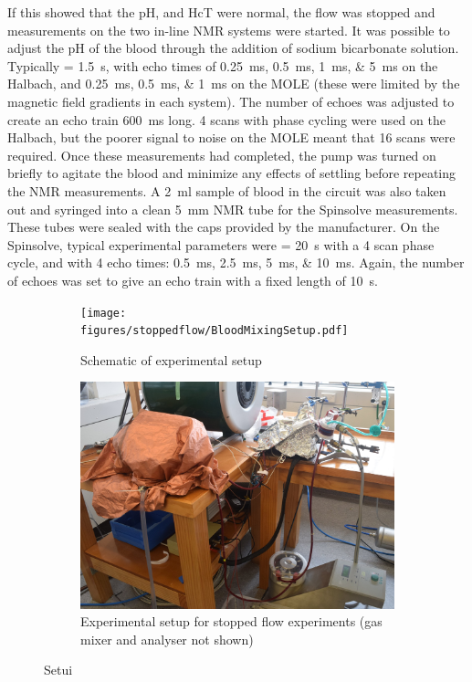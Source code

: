 If this showed that the pH, \SOtwo and HcT were normal, the flow was stopped and measurements on the two in-line NMR systems were started.
It was possible to adjust the pH of the blood through the addition of sodium bicarbonate solution.
Typically \TR = \SI{1.5}{s}, with echo times of \SIlist{0.25;0.5;1;5}{ms} on the Halbach, and \SIlist{0.25; 0.5; 1}{ms} on the MOLE (these were limited by the magnetic field gradients in each system).
The number of echoes was adjusted to create an echo train \SI{600}{ms} long.
4 scans with phase cycling were used on the Halbach, but the poorer signal to noise on the MOLE meant that 16 scans were required.
Once these measurements had completed, the pump was turned on briefly to agitate the blood and minimize any effects of settling before repeating the NMR measurements.
A \SI{2}{ml} sample of blood in the circuit was also taken out and syringed into a clean \SI{5}{mm} NMR tube for the Spinsolve measurements.
These tubes were sealed with the caps provided by the manufacturer.
On the Spinsolve, typical experimental parameters were \TR = \SI{20}{s} with a 4 scan phase cycle, and with 4 echo times: \SIlist{0.5;2.5;5;10}{ms}.
Again, the number of echoes was set to give an echo train with a fixed length of \SI{10}{s}.

\begin{figure}[t]
\centering
\begin{subfigure}[t]{0.48\textwidth}
\texttt{[image: figures/stoppedflow/BloodMixingSetup.pdf]}
\caption{Schematic of experimental setup}
\end{subfigure}
\begin{subfigure}[t]{0.48\textwidth}
\includegraphics[width=\textwidth]{figures/stoppedflow/stoppedflowsetup.jpg}
\caption{Experimental setup for stopped flow experiments (gas mixer and analyser not shown)}
\end{subfigure}
\caption{Setui}
\label{fig:sf-stoppedflowsetup}
\end{figure}

